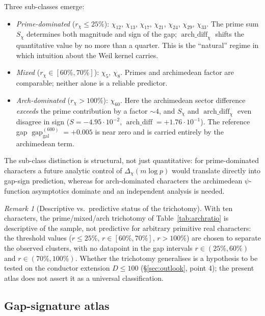 \documentclass[a4paper,10pt,twocolumn]{article}
\theoremstyle{definition}
\theoremstyle{remark}
\newtheorem{remark}[theorem]{Remark}
\newcommand{\gap}{\operatorname{gap}}
\newcommand{\chifn}{\chi}
\newcommand{\Deltachi}{\Delta_{\chifn}}
\newcommand{\archdiff}{\operatorname{arch\_diff}}
\begin{document}
Three sub-classes emerge:
\begin{itemize}
  \item \emph{Prime-dominated} ($r_{\chifn}\leq 25\%$):
    $\chifn_{12}$, $\chifn_{13}$, $\chifn_{17}$, $\chifn_{21}$,
    $\chifn_{24}$, $\chifn_{29}$, $\chifn_{33}$. The prime sum
    $S_{\chifn}$ determines both magnitude and sign of the gap;
    $\archdiff_{\chifn}$ shifts the quantitative value by no more
    than a quarter. This is the ``natural'' regime in which
    intuition about the Weil kernel carries.
  \item \emph{Mixed} ($r_{\chifn}\in[60\%,70\%]$):
    $\chifn_5$, $\chifn_8$. Primes and archimedean factor are
    comparable; neither alone is a reliable predictor.
  \item \emph{Arch-dominated} ($r_{\chifn}>100\%$):
    $\chifn_{60}$. Here the archimedean sector difference
    \emph{exceeds} the prime contribution by a factor $\sim 4$, and
    $S_{\chifn}$ and $\archdiff_{\chifn}$ even disagree in sign
    ($S=-4.95\!\cdot\!10^{-2}$, $\archdiff=+1.76\!\cdot\!10^{-1}$).
    The reference gap
    $\gap_{\mathrm{gal}}^{(600)}=+0.005$ is near zero and is carried
    entirely by the archimedean term.
\end{itemize}

The sub-class distinction is structural, not just quantitative: for
prime-dominated characters a future analytic control of
$\Deltachi(m\log p)$ would translate directly into gap-sign
prediction, whereas for arch-dominated characters the archimedean
$\psi$-function asymptotics dominate and an independent analysis is
needed.

\begin{remark}[Descriptive vs.\ predictive status of the trichotomy]
\label{rem:trichotomy-descriptive}
With ten characters, the prime/mixed/arch trichotomy of
Table~\ref{tab:archratio} is descriptive of the sample, not
predictive for arbitrary primitive real characters: the threshold
values ($r\leq 25\%$, $r\in[60\%,70\%]$, $r>100\%$) are chosen to
separate the observed clusters, with no datapoint in the gap
intervals $r\in(25\%,60\%)$ and $r\in(70\%,100\%)$. Whether the
trichotomy generalises is a hypothesis to be tested on the
conductor extension $D\leq 100$ (\S\ref{sec:outlook}, point 4); the
present atlas does not assert it as a universal classification.
\end{remark}

\subsection{Gap-signature atlas}
\label{sec:gapsig}
\end{document}
